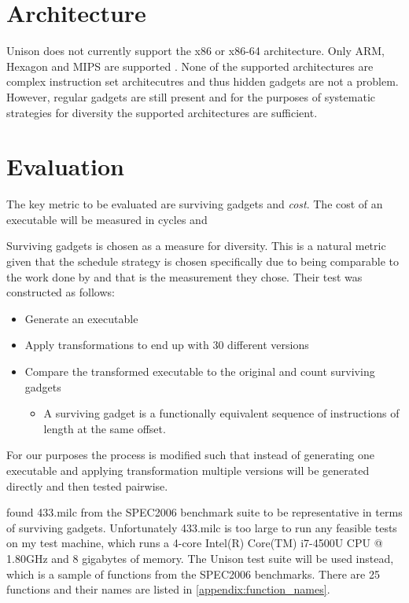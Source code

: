 \section{Architecture}

Unison does not currently support the x86 or x86-64 architecture. Only ARM, Hexagon and MIPS
are supported \cite{unison-src}. None of the supported architectures are complex instruction
set architecutres and thus hidden gadgets are not a problem. However, regular gadgets are
still present and for the purposes of systematic strategies for diversity the supported
architectures are sufficient.

\section{Evaluation}

The key metric to be evaluated are surviving gadgets and \textit{cost}. The cost of an
executable will be measured in cycles and 

Surviving gadgets is chosen as a measure for diversity. This is a natural metric given
that the schedule strategy is chosen specifically due to being comparable to the work done
by \textcite{large-scale-automated} and that is the measurement they chose. Their test
was constructed as follows:

\begin{itemize}
	\item Generate an executable
	\item Apply transformations to end up with 30 different versions
	\item Compare the transformed executable to the original and count surviving gadgets
		\begin{itemize}
			\item A surviving gadget is a functionally equivalent sequence of instructions of
			length at the same offset.
		\end{itemize}
\end{itemize}

For our purposes the process is modified such that instead of generating one executable
and applying transformation multiple versions will be generated directly and then tested
pairwise.

\textcite{large-scale-automated} found 433.milc from the SPEC2006 benchmark suite to be
representative in terms of surviving gadgets. Unfortunately 433.milc is too large to run
any feasible tests on my test machine, which runs a 4-core Intel(R) Core(TM) i7-4500U CPU
@ 1.80GHz and 8 gigabytes of memory. The Unison test suite will be used instead, which is
a sample of functions from the SPEC2006 benchmarks. There are 25 functions and their names
are listed in \ref{appendix:function_names}.

